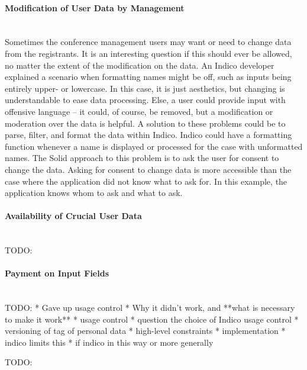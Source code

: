 \paragraph{Modification of User Data by Management}\mbox{}\\

Sometimes the conference management users may want or need to change data from the registrants. It is an interesting question if this should ever be allowed, no matter the extent of the modification on the data. An Indico developer explained a scenario when formatting names might be off, such as inputs being entirely upper- or lowercase. In this case, it is just aesthetics, but changing is understandable to ease data processing. Else, a user could provide input with offensive language -- it could, of course, be removed, but a modification or moderation over the data is helpful. A solution to these problems could be to parse, filter, and format the data within Indico. Indico could have a formatting function whenever a name is displayed or processed for the case with unformatted names. The Solid approach to this problem is to ask the user for consent to change the data. Asking for consent to change data is more accessible than the case where the application did not know what to ask for. In this example, the application knows whom to ask and what to ask.
\vspace{0.5cm}
\paragraph{Availability of Crucial User Data}\mbox{}\\

TODO:
\vspace{0.5cm}
\paragraph{Payment on Input Fields}\mbox{}\\

TODO:
* Gave up usage control
  * Why it didn't work, and **what is necessary to make it work**
    * usage control
    * question the choice of Indico usage control
    * versioning of tag of personal data
* high-level constraints
* implementation
  * indico limits this
* if indico in this way or more generally

TODO:
